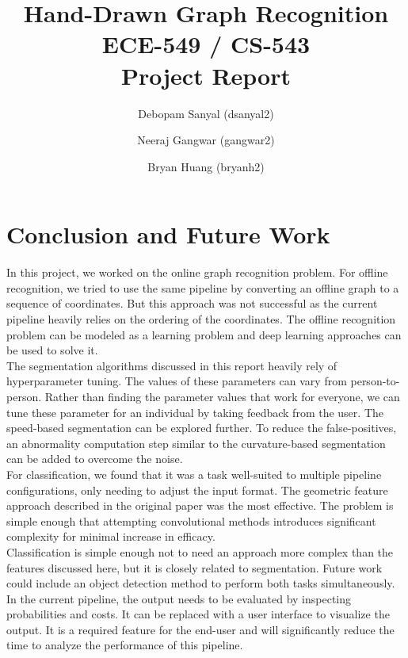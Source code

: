 \documentclass[10pt, twocolumn,letterpaper]{article}
\title{Hand-Drawn Graph Recognition\\
	ECE-549 / CS-543\\
	Project Report}
\author{Debopam Sanyal (dsanyal2) \and Neeraj Gangwar (gangwar2) \and Bryan Huang (bryanh2)}
\begin{document}
	\maketitle
	
	
	
	
	
	
	
	
	
	\section{Conclusion and Future Work}
	In this project, we worked on the online graph recognition problem. For offline recognition, we tried to use the same pipeline by converting an offline graph to a sequence of coordinates. But this approach was not successful as the current pipeline heavily relies on the ordering of the coordinates. The offline recognition problem can be modeled as a learning problem and deep learning approaches can be used to solve it.\\
	
	The segmentation algorithms discussed in this report heavily rely of hyperparameter tuning. The values of these parameters can vary from person-to-person. Rather than finding the parameter values that work for everyone, we can tune these parameter for an individual by taking feedback from the user. The speed-based segmentation can be explored further. To reduce the false-positives, an abnormality computation step similar to the curvature-based segmentation can be added to overcome the noise.\\
	
	For classification, we found that it was a task well-suited to multiple pipeline configurations, only needing to adjust the input format. The geometric feature approach described in the original paper was the most effective. The problem is simple enough that attempting convolutional methods introduces significant complexity for minimal increase in efficacy.\\
    
    Classification is simple enough not to need an approach more complex than the features discussed here, but it is closely related to segmentation. Future work could include an object detection method to perform both tasks simultaneously.\\
    
    In the current pipeline, the output needs to be evaluated by inspecting probabilities and costs.  It can be replaced with a user interface to visualize the output. It is a required feature for the end-user and will significantly reduce the time to analyze the performance of this pipeline.
	
\end{document}
